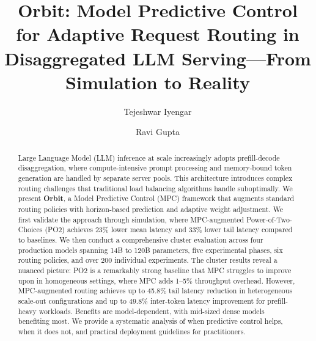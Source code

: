 \documentclass[runningheads]{llncs}
\begin{document}
\title{Orbit: Model Predictive Control for Adaptive Request Routing in Disaggregated LLM Serving---From Simulation to Reality}

\author{Tejeshwar Iyengar \and Ravi Gupta}



\maketitle

\begin{abstract}
Large Language Model (LLM) inference at scale increasingly adopts prefill-decode disaggregation, where compute-intensive prompt processing and memory-bound token generation are handled by separate server pools. This architecture introduces complex routing challenges that traditional load balancing algorithms handle suboptimally. We present \textbf{Orbit}, a Model Predictive Control (MPC) framework that augments standard routing policies with horizon-based prediction and adaptive weight adjustment. We first validate the approach through simulation, where MPC-augmented Power-of-Two-Choices (PO2) achieves 23\% lower mean latency and 33\% lower tail latency compared to baselines. We then conduct a comprehensive cluster evaluation across four production models spanning 14B to 120B parameters, five experimental phases, six routing policies, and over 200 individual experiments. The cluster results reveal a nuanced picture: PO2 is a remarkably strong baseline that MPC struggles to improve upon in homogeneous settings, where MPC adds 1--5\% throughput overhead. However, MPC-augmented routing achieves up to 45.8\% tail latency reduction in heterogeneous scale-out configurations and up to 49.8\% inter-token latency improvement for prefill-heavy workloads. Benefits are model-dependent, with mid-sized dense models benefiting most. We provide a systematic analysis of when predictive control helps, when it does not, and practical deployment guidelines for practitioners.

\end{abstract}

\end{document}
